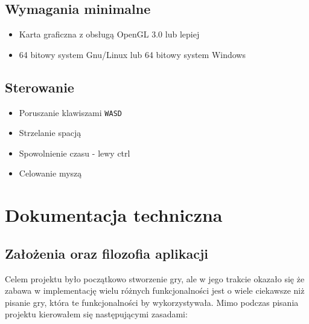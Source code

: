 \documentclass[a4paper,11pt]{article}
\begin{document}
\subsection*{Wymagania minimalne}

\begin{itemize}
    \item Karta graficzna z obsługą OpenGL 3.0 lub lepiej
    \item 64 bitowy system Gnu/Linux lub 64 bitowy system Windows
\end{itemize}

\subsection*{Sterowanie}

\begin{itemize}
    \item Poruszanie klawiszami \texttt{WASD}
    \item Strzelanie spacją
    \item Spowolnienie czasu - lewy ctrl
    \item Celowanie myszą
\end{itemize}

\section{Dokumentacja techniczna}

\subsection{Założenia oraz filozofia aplikacji}

Celem projektu było początkowo stworzenie gry, ale w jego trakcie okazało się że zabawa w implementację wielu różnych funkcjonalności jest o wiele ciekawsze niż pisanie gry, która te funkcjonalności by wykorzystywała. Mimo podczas pisania projektu kierowałem się następującymi zasadami:
\end{document}
